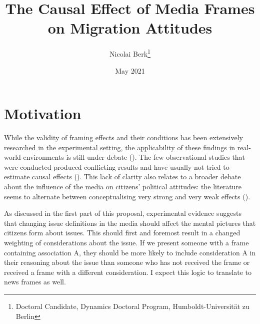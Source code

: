 \documentclass{article}
\title{The Causal Effect of Media Frames on Migration Attitudes}
\author{Nicolai Berk\footnote{Doctoral Candidate, Dynamics Doctoral Program, Humboldt-Universität zu Berlin}}
\date{May 2021}
\begin{document}
\maketitle




\section{Motivation}







While the validity of framing effects and their conditions has been extensively researched in the experimental setting, the applicability of these findings in real-world environments is still under debate (\cite{Barabas2010, Busby2019, Leeper2020}). The few observational studies that were conducted produced conflicting results and have usually not tried to estimate causal effects (\cite{Jerit2008, Jerit2009a, Mclaren2018}). This lack of clarity also relates to a broader debate about the influence of the media on citizens' political attitudes: the literature seems to alternate between conceptualising very strong and very weak effects (\cite{Bennett2008, Spirig2020, Zaller1996}).

As discussed in the first part of this proposal, experimental evidence suggests that changing issue definitions in the media should affect the mental pictures that citizens form about issues. This should first and foremost result in a changed weighting of considerations about the issue. If we present someone with a frame containing association A, they should be more likely to include consideration A in their reasoning about the issue than someone who has not received the frame or received a frame with a different consideration. I expect this logic to translate to news frames as well.
\end{document}
